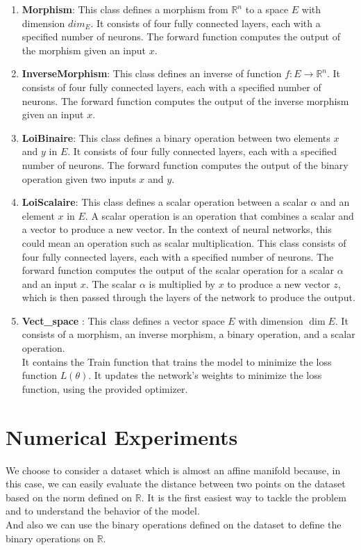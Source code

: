 \documentclass{report}
\begin{document}
    \begin{enumerate}
        \item \textbf{Morphism}: This class defines a morphism from 
        $\mathbb{R}^n$ to a space $E$ with dimension $dim_E$. 
        It consists of four  fully connected layers, each with 
        a specified number of neurons. The forward function computes 
        the output of the morphism given an input $x$.
        \item \textbf{InverseMorphism}: This class defines an inverse
        of function $f: E \rightarrow \mathbb{R}^n$. It consists of
        four fully connected layers, each with a specified number
        of neurons. The forward function computes the output of the
        inverse morphism given an input $x$.
        \item \textbf{LoiBinaire}: This class defines a binary operation 
        between two elements $x$ and $y$ in $E$. It consists of four  
        fully connected layers, each with a specified number of neurons. 
        The forward function computes the output of the binary operation 
        given two inputs $x$ and $y$.
        \item \textbf{LoiScalaire}: 
        This class defines a scalar operation between a scalar $\alpha$ and an element $x$ in $E$. A scalar operation is an operation that combines a scalar and a vector to produce a new vector. In the context of neural networks, this could mean an operation such as scalar multiplication. This class consists of four fully connected layers, each with a specified number of neurons. The forward function computes the output of the scalar operation for a scalar $\alpha$ and an input $x$. The scalar $\alpha$ is multiplied by $x$ to produce a new vector $z$, which is then passed through the layers of the network to produce the output.
        \item \textbf{Vect\_space} : This class defines a vector space $E$ with dimension $\dim{E}$. It consists of a morphism, an inverse morphism, a binary operation, and a scalar operation. 
        \\ 
        It contains the Train function that trains the model to minimize the loss function $L(\theta)$. It updates the network's weights to minimize the loss function, using the provided optimizer. 
    \end{enumerate}


\section{Numerical Experiments}
    We choose to consider a dataset  which is almost an affine manifold because, in this case, we can easily evaluate the distance between two points on the dataset based on the norm defined on $\mathbb{R}$. It is the first easiest way to tackle the problem and to understand the behavior of the model.\\
    And also we can use the binary operations defined on the dataset to define the binary operations on $\mathbb{R}$.
\end{document}
